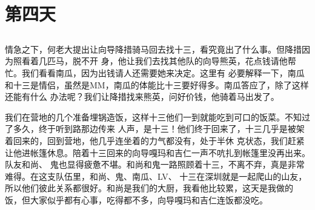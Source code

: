 ﻿\documentclass[hyperref={bookmarks=ture}xcolor=pdflatex,svgnames,table,compress]{beamer}
\begin{document}
\section{第四天}


\subsection{}
\begin{frame}
\begin{center}
\end{center}
\end{frame}

\subsection{}
\begin{frame}
\begin{ztebox} 
{\footnotesize
  情急之下，何老大提出让向导降措骑马回去找十三，看究竟出了什么事。但降措因为照看着几匹马，脱不开
  身，他让我们去找其他队的向导熊英，花点钱请他帮忙。我们看看南瓜，因为出钱请人还需要她来决定。这里有
  必要解释一下，南瓜和十三是情侣，虽然是MM，南瓜的体能比十三要好得多。南瓜答应了，除了这样还能有什么
  办法呢？我们让降措找来熊英，问好价钱，他骑着马出发了。
}
\end{ztebox}
\begin{ztebox}
{\footnotesize
  我们在营地的几个准备埋锅造饭，这样十三他们一到就能吃到可口的饭菜。不知过了多久，终于听到路那边传来
  人声，是十三！他们终于回来了，十三几乎是被架着回来的，回到营地，他几乎连坐着的力气都没有，处于半休
  克状态，我们赶紧让他进帐篷休息。陪着十三回来的向导嘎玛和吉仁一声不吭扎到帐篷里没再出来。队友和尚、
  鬼也显得疲惫不堪。和尚和鬼一路照顾着十三，不离不弃，真是非常难得。在这支队伍里，和尚、鬼、南瓜、LV、
  十三在深圳就是一起爬山的山友，所以他们彼此关系都很好。和尚是我们的大厨，我看他比较累，这天是我做的
  饭，但大家似乎都有心事，吃得都不多，向导嘎玛和吉仁连饭都没吃。
}
\end{ztebox}
\end{frame}
\end{document}
